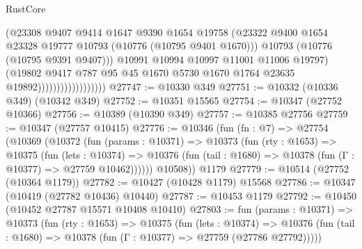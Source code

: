 \begin{lexlean}{RustCore}
\begin{coremodule}
                                        (@23308
                                          @9407
                                          @9414
                                          @1647
                                          @9390
                                          @1654
                                          @19758
                                          (@23322
                                            @9400
                                            @1654
                                            @23328
                                            @19777
                                            @10793
                                            (@10776 (@10795 @9401 @1670)))
                                          @10793
                                          (@10776 (@10795 @9391 @9407)))
                                        @10991
                                        @10994
                                        @10997
                                        @11001
                                        @11006
                                        @19797)
                                      (@19802
                                        @9417
                                        @787
                                        @95
                                        @45
                                        @1670
                                        @5730
                                        @1670
                                        @1764
                                        @23635
                                        @19892))))))))))))))))))
@27747 := @10330 @349
@27751 := @10332 (@10336 @349) (@10342 @349)
@27752 := @10351 @15565
@27754 := @10347 (@27752 @10366)
@27756 := @10389 (@10390 @349)
@27757 := @10385 @27756
@27759 := @10347 (@27757 @10415)
@27776 := @10346
    (fun (fn : @7) =>
    @27754
      (@10369
        (@10372
          (fun (params : @10371) =>
          @10373
            (fun (rty : @1653) =>
            @10375
              (fun (lets : @10374) =>
              @10376 (fun (tail : @1680) => @10378 (fun (Γ : @10377) => @27759 @10462))))))
        @10508))
    @1179
@27779 := @10514 (@27752 (@10364 @1179))
@27782 := @10427 (@10428 @1179) @15568
@27786 := @10347 (@10419 (@27782 @10436) @10440)
@27787 := @10453 @1179
@27792 := @10450 (@10452 @27787 @15571 @10408 @10410)
@27803 := fun (params : @10371) =>
  @10373
    (fun (rty : @1653) =>
    @10375
      (fun (lets : @10374) =>
      @10376 (fun (tail : @1680) => @10378 (fun (Γ : @10377) => @27759 (@27786 @27792)))))

\end{coremodule}
\end{lexlean}
